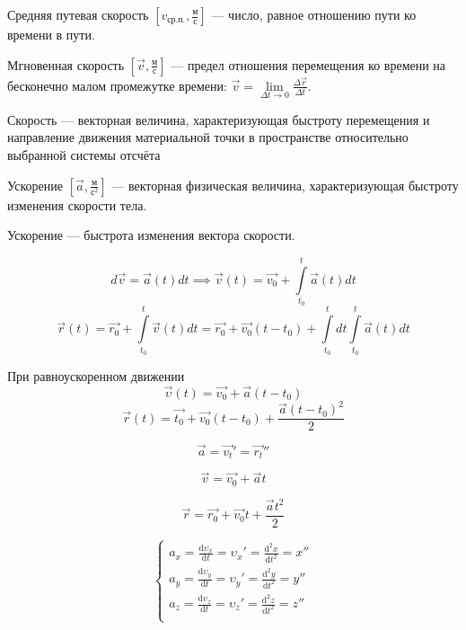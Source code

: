 \begin{definition}
    Средняя путевая скорость $[v_{ср.п.}, \frac{м}{с}]$ — число, равное отношению пути ко времени в пути.
\end{definition}

\begin{definition}
    Мгновенная скорость  $[\vec v, \frac{м}{с}]$ — предел отношения перемещения ко времени на бесконечно малом промежутке времени: 
$\vec v = \lim\limits_{\Delta t\to0}\frac{\Delta\vec r}{\Delta t}$.
\end{definition}

\begin{definition}
    Скорость — векторная величина, характеризующая быстроту перемещения и направление движения материальной точки в пространстве относительно выбранной системы отсчёта
\end{definition}

\begin{definition}
    Ускорение $[\vec a, \frac{м}{с^2}]$ — векторная физическая величина, характеризующая быстроту изменения скорости тела.
\end{definition}

\begin{remark}
    Ускорение — быстрота изменения вектора скорости.
\end{remark}

$$d\vec v = \vec a(t) dt \implies \vec v(t) = \vec{v_0} + \int\limits_{t_0}^{t} \vec a(t) dt$$
$$\vec r(t) = \vec{r_0} + \int\limits_{t_0}^{t} \vec v(t)dt = \vec{r_0} + \vec{v_0}(t-t_0) + \int\limits_{t_0}^{t} dt \int\limits_{t_0}^{t} \vec a(t) dt$$

При равноускоренном движении
$$\vec\upsilon(t)=\vec{v_0}+\vec a(t-t_0)$$
$$\vec r(t)=\vec{t_0}+\vec{v_0}(t-t_0)+\frac{\vec a(t-t_0)^2}{2}$$


$$\vec{a} = \vec{v_t}' = \vec{r_t}''$$

$$\vec{v} = \vec{v_0} + \vec{a}t$$

$$\vec{r} = \vec{r_0} + \vec{v_0}t + \frac{\vec a t^2}{2}$$

$$\begin{cases}
a_x=\frac{\mathrm{d}\upsilon_x}{\mathrm{d}t}=\upsilon_x'=\frac{\mathrm{d}^2x}{\mathrm{d}t^2}=x''\\
a_y=\frac{\mathrm{d}\upsilon_y}{\mathrm{d}t}=\upsilon_y'=\frac{\mathrm{d}^2y}{\mathrm{d}t^2}=y''\\
a_z=\frac{\mathrm{d}\upsilon_z}{\mathrm{d}t}=\upsilon_z'=\frac{\mathrm{d}^2z}{\mathrm{d}t^2}=z''\\
\end{cases}$$

